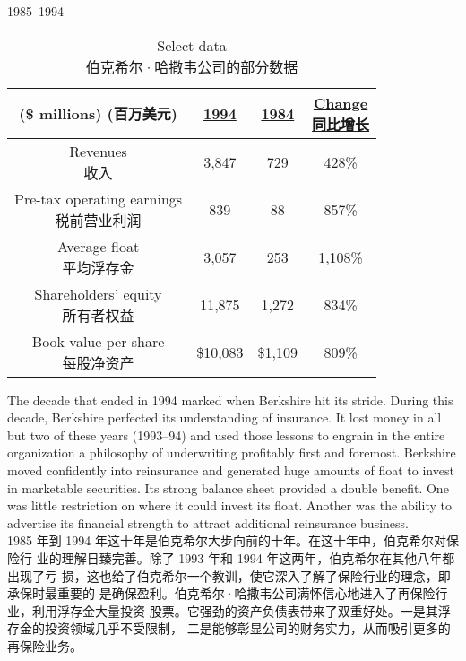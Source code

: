 \begin{section}{1985--1994}

\begin{table}[!htbp]
  \centering
  \begin{center}
    \begin{tabular}{cccc}
      \toprule
      \makecell[c]{(\$ millions) \\ (百万美元)} & \underline{1994} & \underline{1984} & \makecell[c]{\underline{Change} \\ \underline{同比增长}} \\
      \midrule
      \makecell[c]{Revenues \\ 收入} & 3,847 & 729 & 428\% \\
      \makecell[c]{Pre-tax operating earnings \\ 税前营业利润} & 839 & 88 & 857\% \\
      \makecell[c]{Average float \\ 平均浮存金} & 3,057 & 253 & 1,108\% \\
      \makecell[c]{Shareholders' equity \\ 所有者权益} & 11,875 & 1,272 & 834\% \\
      \makecell[c]{Book value per share \\ 每股净资产} & \$10,083 & \$1,109 & 809\% \\
      \bottomrule
    \end{tabular}
    \caption{Select data \\ 伯克希尔·哈撒韦公司的部分数据}
  \end{center}
\end{table}

\begin{verseparallel}
  {
    The decade that ended in 1994 marked when Berkshire hit its stride. During
    this decade, Berkshire perfected its understanding of insurance. It lost
    money in all but two of these years (1993--94) and used those lessons to
    engrain in the entire organization a philosophy of underwriting profitably
    first and foremost. Berkshire moved confidently into reinsurance and
    generated huge amounts of float to invest in marketable securities. Its
    strong balance sheet provided a double benefit. One was little restriction
    on where it could invest its float. Another was the ability to advertise its
    financial strength to attract additional reinsurance business. \\
  }
  {
    1985 年到 1994 年这十年是伯克希尔大步向前的十年。在这十年中，伯克希尔对保险行
    业的理解日臻完善。除了 1993 年和 1994 年这两年，伯克希尔在其他八年都出现了亏
    损，这也给了伯克希尔一个教训，使它深入了解了保险行业的理念，即承保时最重要的
    是确保盈利。伯克希尔·哈撒韦公司满怀信心地进入了再保险行业，利用浮存金大量投资
    股票。它强劲的资产负债表带来了双重好处。一是其浮存金的投资领域几乎不受限制，
    二是能够彰显公司的财务实力，从而吸引更多的再保险业务。
  }
\end{verseparallel}


\end{section}
